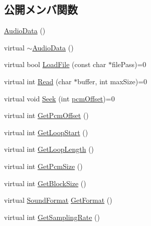 \subsection*{公開メンバ関数}
\begin{DoxyCompactItemize}
\item 
\mbox{\hyperlink{class_k___audio_1_1_audio_data_a78c3668af550d54e5a16e5658afc4ec8}{Audio\+Data}} ()
\item 
virtual \mbox{\hyperlink{class_k___audio_1_1_audio_data_aebb74e1d7096a4580497da2bd72c019c}{$\sim$\+Audio\+Data}} ()
\item 
virtual bool \mbox{\hyperlink{class_k___audio_1_1_audio_data_a97453a72c7161214868303f6fdca9494}{Load\+File}} (const char $\ast$file\+Pass)=0
\item 
virtual int \mbox{\hyperlink{class_k___audio_1_1_audio_data_af42b123ad2ce45867401d697fd572392}{Read}} (char $\ast$buffer, int max\+Size)=0
\item 
virtual void \mbox{\hyperlink{class_k___audio_1_1_audio_data_a1ba3ab1b4bae0b460d26278cb29ce16e}{Seek}} (int \mbox{\hyperlink{class_k___audio_1_1_audio_data_a8c1a6d96d9c2c55467baf9c0e7e58c98}{pcm\+Offset}})=0
\item 
virtual int \mbox{\hyperlink{class_k___audio_1_1_audio_data_ae075eaedf3a552c083d0ed7e0c24fdce}{Get\+Pcm\+Offset}} ()
\item 
virtual int \mbox{\hyperlink{class_k___audio_1_1_audio_data_a94740233be10a58fba516fe6ae0aaa3a}{Get\+Loop\+Start}} ()
\item 
virtual int \mbox{\hyperlink{class_k___audio_1_1_audio_data_ae29cd0dcfcd55a12d6279f4b95956f1b}{Get\+Loop\+Length}} ()
\item 
virtual int \mbox{\hyperlink{class_k___audio_1_1_audio_data_ac44af4a5c1cecb476fff9faa2cab64b8}{Get\+Pcm\+Size}} ()
\item 
virtual int \mbox{\hyperlink{class_k___audio_1_1_audio_data_a2a5e7bf50936f9974a4e6f07bdb45037}{Get\+Block\+Size}} ()
\item 
virtual \mbox{\hyperlink{class_k___audio_1_1_audio_data_a7ef9acd4f7d2140951605d835cff2435}{Sound\+Format}} \mbox{\hyperlink{class_k___audio_1_1_audio_data_a7d2e29b72ce32c6b733b856b59d38492}{Get\+Format}} ()
\item 
virtual int \mbox{\hyperlink{class_k___audio_1_1_audio_data_a52ca0190e77d44e12ca222a7eb1b5e84}{Get\+Sampling\+Rate}} ()
\end{DoxyCompactItemize}
